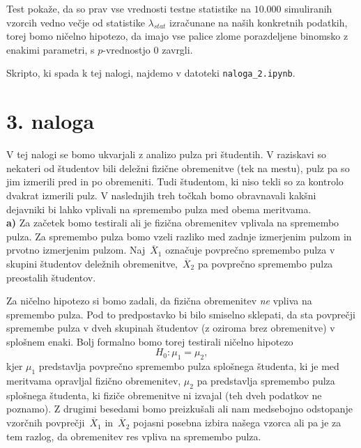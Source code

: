 \documentclass[a4paper,11pt]{article}
\newcommand{\olsi}[1]{\,\overline{\!{#1}}} %
\begin{document}
Test pokaže, da so prav vse vrednosti testne statistike na $10.000$ simuliranih vzorcih vedno večje od statistike $\lambda_{stat}$ izračunane na naših konkretnih podatkih, torej bomo ničelno hipotezo, da imajo vse palice zlome porazdeljene binomsko z enakimi parametri, s $p$-vrednostjo $0$ zavrgli.

Skripto, ki spada k tej nalogi, najdemo v datoteki \texttt{naloga\_2.ipynb}.

\section*{3. naloga}

V tej nalogi se bomo ukvarjali z analizo pulza pri študentih. V raziskavi so nekateri od študentov bili deležni fizične obremenitve (tek na mestu), pulz pa so jim izmerili pred in po obremeniti. Tudi študentom, ki niso tekli so za kontrolo dvakrat izmerili pulz. V naslednjih treh točkah bomo obravnavali kakšni dejavniki bi lahko vplivali na spremembo pulza med obema meritvama.
\\

\noindent
\textbf{a)} Za začetek bomo testirali ali je fizična obremenitev vplivala na spremembo pulza. Za spremembo pulza bomo vzeli razliko med zadnje izmerjenim pulzom in prvotno izmerjenim pulzom. Naj $\olsi{X}_1$ označuje povprečno spremembo pulza v skupini študentov deležnih obremenitve, $\olsi{X}_2$ pa povprečno spremembo pulza preostalih študentov. 

Za ničelno hipotezo si bomo zadali, da fizična obremenitev \emph{ne} vpliva na spremembo pulza. Pod to predpostavko bi bilo smiselno sklepati, da sta povprečji spremembe pulza v dveh skupinah študentov (z oziroma brez obremenitve) v splošnem enaki. Bolj formalno bomo torej testirali ničelno hipotezo
\[
    H_0 : \mu_1 = \mu_2,
\]
kjer $\mu_1$ predstavlja povprečno spremembo pulza splošnega študenta, ki je med meritvama opravljal fizično obremenitev, $\mu_2$ pa predstavlja spremembo pulza splošnega študenta, ki fiziče obremenitve ni izvajal (teh dveh podatkov ne poznamo). Z drugimi besedami bomo preizkušali ali nam medsebojno odstopanje vzorčnih povprečji $\olsi{X}_1$ in $\olsi{X}_2$ pojasni posebna izbira našega vzorca ali pa je za tem razlog, da obremenitev res vpliva na spremembo pulza. 
\end{document}
